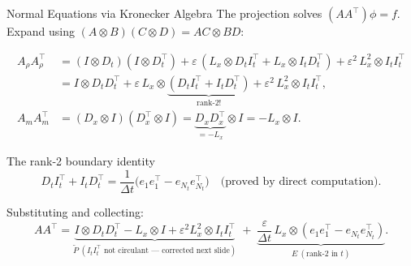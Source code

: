 \documentclass[10pt,aspectratio=169]{beamer}
\newcommand{\eps}{\varepsilon}
\newcommand{\Dt}{D_t}
\newcommand{\DtT}{D_t^{\!\top}}
\newcommand{\It}{I_t}
\newcommand{\ItT}{I_t^{\!\top}}
\newcommand{\Dx}{D_x}
\newcommand{\DxT}{D_x^{\!\top}}
\newcommand{\Lx}{L_x}
\newcommand{\kron}{\otimes}
\begin{document}
\begin{frame}{Normal Equations via Kronecker Algebra}
  The projection solves $(AA^\top)\phi = f$.
  Expand using $(A\kron B)(C\kron D) = AC\kron BD$:

  \smallskip
  \begin{align*}
    A_\rho A_\rho^\top
    &= (I\kron\Dt)(I\kron\DtT)
     + \eps\,({\Lx}\kron\Dt\ItT + \Lx\kron\It\DtT)
     + \eps^2\,\Lx^2\kron\It\ItT \\
    &= I\kron\Dt\DtT
     + \eps\,\Lx\kron\underbrace{(\Dt\ItT+\It\DtT)}_{\text{rank-2!}}
     + \eps^2\,\Lx^2\kron\It\ItT, \\[4pt]
    A_m A_m^\top
    &= (\Dx\kron I)(\DxT\kron I)
     = \underbrace{\Dx\DxT}_{=-\Lx}\kron I
     = -\Lx\kron I.
  \end{align*}

  \medskip
  \begin{alertblock}{The rank-2 boundary identity}
  \[
    \Dt\ItT + \It\DtT
    = \frac{1}{\Delta t}\bigl(e_1 e_1^\top - e_{N_t}e_{N_t}^\top\bigr)
    \quad\text{(proved by direct computation)}.
  \]
  \end{alertblock}

  \smallskip
  Substituting and collecting:
  \[
    AA^\top
    = \underbrace{I\kron\Dt\DtT - \Lx\kron I + \eps^2\Lx^2\kron\It\ItT}_{\widetilde{P}\ (\It\ItT\text{ not circulant — corrected next slide})}
    \;+\;
    \underbrace{\frac{\eps}{\Delta t}\,\Lx\kron(e_1 e_1^\top - e_{N_t}e_{N_t}^\top)}_{E\ (\mathrm{rank\text{-}}2\text{ in }t)}.
  \]
\end{frame}
\end{document}
